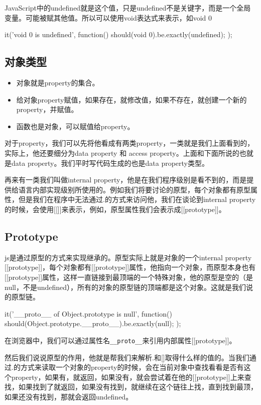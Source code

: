 JavaScript中的undefined就是这个值，只是undefined不是关键字，而是一个全局变量。可能被赋其他值。所以可以使用void表达式来表示，如void 0 
\begin{JavaScript}
		it('void 0 is undefined', function(){
			should(void 0).be.exactly(undefined);
		});
\end{JavaScript}

\subsection{对象类型}

\begin{itemize}
\item 对象就是property的集合。
\item 给对象property赋值，如果存在，就修改值，如果不存在，就创建一个新的property，并赋值。
\item 函数也是对象，可以赋值给property。
\end{itemize}
	
对于property，我们可以先将他看成有两类property，一类就是我们上面看到的，实际上，他还要细分为data property 和 access property。上面和下面所说的也就是data property。我们平时写代码生成的也是data property类型。
	
再来有一类我们叫做internal property，他是在我们程序级别是看不到的，而是提供给语言内部实现级别所使用的。例如我们将要讨论的原型，每个对象都有原型属性，但是我们在程序中无法通过.的方式来访问他，我们在谈论到internal property的时候，会使用[[]]来表示，例如，原型属性我们会表示成[[prototype]]。
	
\subsection{Prototype}
	
js是通过原型的方式来实现继承的。原型实际上就是对象的一个internal property [[prototype]]，每个对象都有[[prototype]]属性，他指向一个对象，而原型本身也有[[prototype]]属性，这样一直链接到最顶端的一个特殊对象，他的原型是空的（是null，不是undefined），所有的对象的原型链的顶端都是这个对象。这就是我们说的原型链。
\begin{JavaScript}[原型链的顶端是null]
		it('__proto__ of Object.prototype is null', function(){
			should(Object.prototype.__proto__).be.exactly(null);
		});
\end{JavaScript}
在浏览器中，我们可以通过属性名\lstinline!__proto__!来引用内部属性[[prototype]]。
	
然后我们说说原型的作用，他就是帮我们来解析.和[]取得什么样的值的。当我们通过.的方式来读取一个对象的property的时候，会在当前对象中查找看看是否有这个property，如果有，就返回，如果没有，就会尝试着在他的[[prototype]]上来查找，如果找到了就返回，如果没有找到，就继续在这个链往上找，直到找到最顶，如果还没有找到，那就会返回undefined。
	
